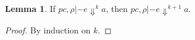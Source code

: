 \documentclass{article}
\newcommand{\pc}{\ensuremath{{\mathit{pc}}}}
\theoremstyle{definition}
\newtheorem{lemma}{Lemma}
\begin{document}

\begin{lemma}
  If $\pc, \rho |- e \Downarrow^{k} a$, then
  $\pc, \rho |- e \Downarrow^{k+1} a$.
  \label{lem:semantics-ind}
\end{lemma}
\begin{proof}
  By induction on $k$.
\end{proof}
\end{document}
